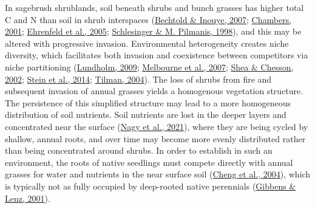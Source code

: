 \documentclass[
  11pt,
  a4paper,
]{article}
\begin{document}
In sagebrush shrublands, soil beneath shrubs and bunch grasses has higher total C and N than soil in shrub interspaces (\protect\hyperlink{ref-Bechtold2007}{Bechtold \& Inouye, 2007}; \protect\hyperlink{ref-Chambers2001}{Chambers, 2001}; \protect\hyperlink{ref-Ehrenfeld2005}{Ehrenfeld et al., 2005}; \protect\hyperlink{ref-Schlesinger1998}{Schlesinger \& M. Pilmanis, 1998}), and this may be altered with progressive invasion. Environmental heterogeneity creates niche diversity, which facilitates both invasion and coexistence between competitors via niche partitioning (\protect\hyperlink{ref-Lundholm2009}{Lundholm, 2009}; \protect\hyperlink{ref-Melbourne2007}{Melbourne et al., 2007}; \protect\hyperlink{ref-Shea2002}{Shea \& Chesson, 2002}; \protect\hyperlink{ref-Stein2014}{Stein et al., 2014}; \protect\hyperlink{ref-Tilman2004}{Tilman, 2004}). The loss of shrubs from fire and subsequent invasion of annual grasses yields a homogenous vegetation structure. The persistence of this simplified structure may lead to a more homogeneous distribution of soil nutrients. Soil nutrients are lost in the deeper layers and concentrated near the surface (\protect\hyperlink{ref-Nagy2021}{Nagy et al., 2021}), where they are being cycled by shallow, annual roots, and over time may become more evenly distributed rather than being concentrated around shrubs. In order to establish in such an environment, the roots of native seedlings must compete directly with annual grasses for water and nutrients in the near surface soil (\protect\hyperlink{ref-Cheng2004}{Cheng et al., 2004}), which is typically not as fully occupied by deep-rooted native perennials (\protect\hyperlink{ref-Gibbens2001}{Gibbens \& Lenz, 2001}).
\end{document}
